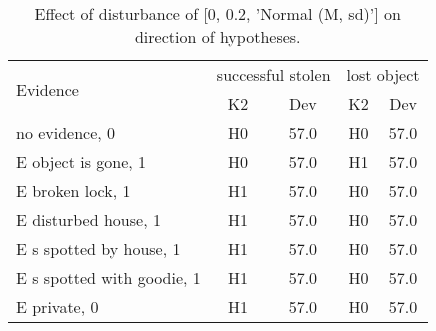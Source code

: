 \begin{table}\begin{tabular}{l|cc|cc}\toprule\multirow{2}{*}{Evidence} & \multicolumn{2}{c}{successful stolen}& \multicolumn{2}{c}{lost object}\\& {K2} & {Dev}& {K2} & {Dev}\\\midrule
no evidence, 0 & \cellcolor{Bittersweet}H0&\cellcolor{Bittersweet}57.0&\cellcolor{Bittersweet}H0&\cellcolor{Bittersweet}57.0\\E object is gone, 1 & \cellcolor{Bittersweet}H0&\cellcolor{Bittersweet}57.0&\cellcolor{Bittersweet}H1&\cellcolor{Bittersweet}57.0\\E broken lock, 1 & \cellcolor{Bittersweet}H1&\cellcolor{Bittersweet}57.0&\cellcolor{Bittersweet}H0&\cellcolor{Bittersweet}57.0\\E disturbed house, 1 & \cellcolor{Bittersweet}H1&\cellcolor{Bittersweet}57.0&\cellcolor{Bittersweet}H0&\cellcolor{Bittersweet}57.0\\E s spotted by house, 1 & \cellcolor{Bittersweet}H1&\cellcolor{Bittersweet}57.0&\cellcolor{Bittersweet}H0&\cellcolor{Bittersweet}57.0\\E s spotted with goodie, 1 & \cellcolor{Bittersweet}H1&\cellcolor{Bittersweet}57.0&\cellcolor{Bittersweet}H0&\cellcolor{Bittersweet}57.0\\E private, 0 & \cellcolor{Bittersweet}H1&\cellcolor{Bittersweet}57.0&\cellcolor{Bittersweet}H0&\cellcolor{Bittersweet}57.0\\\bottomrule\end{tabular}\caption{Effect of disturbance of [0, 0.2, 'Normal (M, sd)'] on direction of hypotheses.}\end{table}
